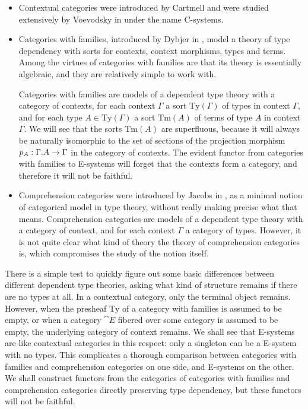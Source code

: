 \begin{itemize}
\item Contextual categories were introduced by Cartmell \cite{Cartmell1986} and were studied
extensively by Voevodsky in \cite{VV_Csys_univ,VV_C-systems_monad,VV_C-systems_quotients}
under the name C-systems.
\item Categories with families, introduced by Dybjer in \cite{Dybjer1996}, model a
theory of type dependency with sorts for contexts, context morphisms, types
and terms. Among the virtues of categories with families are that its theory
is essentially algebraic, and they are relatively simple to work with.

Categories with families are models of a dependent type theory with a
category of contexts, for each context $\Gamma$ a sort $\mathrm{Ty}(\Gamma)$ of
types in context $\Gamma$, and for each type $A\in\mathrm{Ty}(\Gamma)$ a sort
$\mathrm{Tm}(A)$ of terms of type $A$ in context $\Gamma$. We will see that
the sorts $\mathrm{Tm}(A)$ are superfluous, because it will always be 
naturally isomorphic to the set of sections of the projection morphism
$p_A:\ctxext{\Gamma}{A}\to\Gamma$ in the category of contexts. The evident
functor from categories with families to E-systems will forget that the contexts
form a category, and therefore it will not be faithful.
\item Comprehension categories were introduced by Jacobs in \cite{Jacobs1993}, as
a minimal notion of categorical model in type theory, without really making
precise what that means. 
Comprehension categories are models of a dependent type theory with a
category of context, and for each context $\Gamma$ a category of types.
However, it is not quite clear what kind of theory the theory of comprehension
categories is, which compromises the study of the notion itself.
\end{itemize}

There is a simple test to quickly figure out some basic differences between different
dependent type theories, asking what kind of structure remains if there are no
types at all. In a contextual category, only the terminal object remains.
However, when the presheaf $\mathrm{Ty}$ of a category with families is assumed
to be empty, or when a category $\cat{E}$ fibered over some category is assumed
to be empty, the underlying category of context remains. We shall see that
E-systems are like contextual categories in this respect: only a singleton can
be a E-system with no types. This complicates a thorough comparison between
categories with families and comprehension categories on one side, and E-systems
on the other. We shall construct functors from the categories of categories with
families and comprehension categories directly preserving type dependency, but
these functors will not be faithful. 


